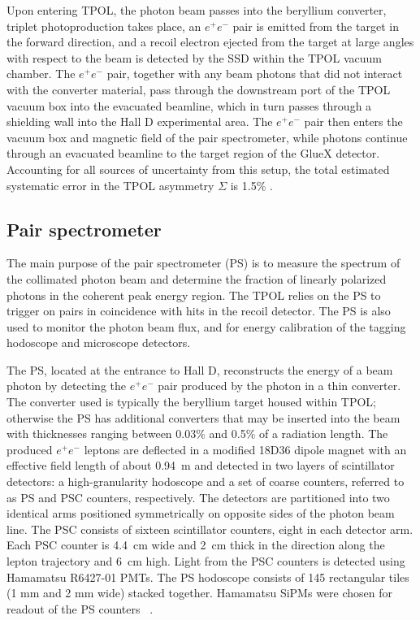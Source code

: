 Upon entering TPOL, the photon beam passes into the
beryllium converter, triplet photoproduction takes place, an
$e^+e^-$ pair is emitted from the target in the forward direction,
and a recoil electron ejected from the target at large angles with
respect to the beam is detected by the SSD within the TPOL vacuum chamber.
The $e^+e^-$ pair, together with any beam photons that did not
interact with the converter material, pass through the downstream port of
the TPOL vacuum box into the evacuated beamline, which in turn passes
through a shielding wall into the Hall D experimental area. 
The $e^+e^-$ pair then enters the vacuum box and magnetic field of the \GX{}
pair spectrometer, while photons continue through an evacuated beamline to
the target region of the GlueX detector. Accounting for all sources of
uncertainty from this setup, the total estimated systematic error in
the TPOL asymmetry $\Sigma$ is 1.5\% \cite{DUGGER2017115}.

\subsection{Pair spectrometer  \label{sec:ps}}
The main purpose of the pair spectrometer (PS) \cite{BARBOSA2015376} 
is to measure the spectrum of the
collimated photon beam and determine the fraction of linearly polarized
photons in the coherent peak energy region. The TPOL relies on the PS
to trigger on pairs in coincidence with hits in the recoil detector.
The PS is also used to monitor the photon beam flux, and for 
energy calibration of the tagging hodoscope and microscope detectors.

The PS, located at the entrance to Hall D, %
reconstructs the energy of a beam photon by detecting
the $e^+e^-$ pair produced by the photon in a thin converter.
The converter used is typically the beryllium target housed within TPOL; 
otherwise the PS has additional converters that may
be inserted into the beam with thicknesses ranging between 0.03\%
and 0.5\% of a radiation length.
The produced $e^+e^-$ leptons are deflected in a modified 18D36 dipole magnet
with an effective field length of about 0.94~m and detected in two
layers of scintillator detectors: a high-granularity hodoscope and
a set of coarse counters, referred to as PS and PSC counters, respectively.
The detectors are partitioned into two identical arms positioned symmetrically on
opposite sides of the photon beam line. The PSC consists of sixteen
scintillator counters, eight in each detector arm. Each PSC counter is
4.4~cm wide and 2~cm thick in the direction along the lepton trajectory
and 6~cm high. Light from the PSC counters is detected using Hamamatsu
R6427-01 PMTs. The PS hodoscope consists of 145 rectangular tiles
(1 mm and 2 mm wide) stacked together. Hamamatsu SiPMs were chosen for
readout of the PS counters
~\cite{Barbosa:2017zzw,Somov:2017kif,Tolstukhin:2014zsa}.

